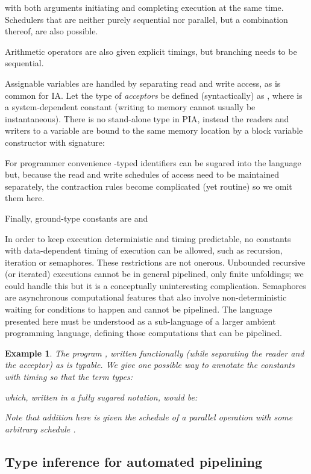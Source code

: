 \documentclass{article}
\newtheorem{example}[theorem]{Example}
\begin{document}
with both arguments initiating and completing execution at the same time. Schedulers that are neither purely sequential nor parallel, but a combination thereof, are also possible. 

Arithmetic operators are also given explicit timings, but branching needs to be sequential.


Assignable variables are handled by separating read and write access, as is common for IA. Let the type of \emph{acceptors} be defined (syntactically) as , where  is a system-dependent constant (writing to memory cannot usually be instantaneous). There is no stand-alone  type in PIA, instead the readers and writers to a variable are bound to the same memory location by a block variable constructor with signature:

For programmer convenience -typed identifiers can be sugared into the language but, because the read and write schedules of access need to be maintained separately, the contraction rules become complicated (yet routine) so we omit them here. 

Finally, ground-type constants are 
 and 

In order to keep execution deterministic and timing predictable, no constants with data-dependent timing of execution can be allowed, such as recursion, iteration or semaphores. These restrictions are not onerous. Unbounded recursive (or iterated) executions cannot be in general pipelined, only finite unfoldings; we could handle this but it is a conceptually uninteresting complication. Semaphores are asynchronous computational features that also involve non-deterministic waiting for conditions to happen and cannot be pipelined. The language presented here must be understood as a sub-language of a larger ambient programming language, defining those computations that can be pipelined. 

\begin{example} \label{ex:incx}
The program , written functionally (while separating the reader and the acceptor) as  is typable. We give one possible way to annotate the constants with timing so that the term types:

which, written in a fully sugared notation, would be:

Note that addition here is given the schedule of a parallel operation with some arbitrary schedule .
\end{example}

\subsection{Type inference for automated pipelining}\label{sec:typin}\label{sec:pip}
\end{document}
